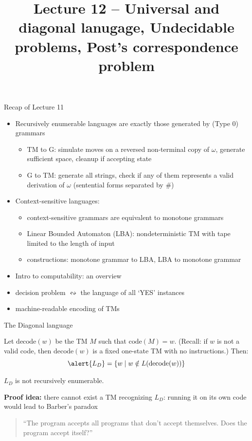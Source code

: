 \documentclass[handout]{beamer}
\title{Lecture 12 -- Universal and diagonal lanugage, Undecidable problems, Post's correspondence problem}
\begin{document}
\frame{\titlepage}


\begin{frame}{Recap of Lecture 11}
	
    \begin{itemize}        
        \item Recursively enumerable languages are exactly those generated by (Type 0) grammars
        \begin{itemize}
            \item TM to G: simulate moves on a reversed non-terminal copy of $\omega$, generate sufficient space, cleanup if accepting state
            \item G to TM: generate all strings, check if any of them represents a valid derivation of $\omega$ (sentential forms separated by $\#$)
        \end{itemize}   
        \item Context-sensitive languages:
        \begin{itemize}
            \item context-sensitive grammars are equivalent to monotone grammars
            \item Linear Bounded Automaton (LBA): nondeterministic TM with tape limited to the length of input
            \item constructions: monotone grammar to LBA, LBA to monotone grammar
        \end{itemize}
        \item Intro to computability: an overview
        \item decision problem $\leftrightsquigarrow$ the language of all `YES' instances
        \item machine-readable encoding of TMs
    \end{itemize}
	
\end{frame}


\begin{frame}{The Diagonal language}
    
    Let \alert{$\mathrm{decode}(w)$} be the TM $M$ such that $\mathrm{code}(M)=w$. (Recall: if $w$ is not a valid code, then $\mathrm{decode}(w)$ is a fixed one-state TM with no instructions.) Then:
    $$
    \alert{L_D}=\{w\mid w\notin L(\mathrm{decode}(w))\}
    $$
        
    \begin{theorem}
        $L_D$ is not recursively enumerable.
    \end{theorem}
    
    \textbf{Proof idea:} there cannot exist a TM recognizing $L_D$: running it on its own code would lead to Barber's paradox

    \bigskip

    \begin{quote}
        ``The program accepts all programs that don't accept themselves. Does the program accept itself?''
    \end{quote}

\end{frame}
\end{document}
